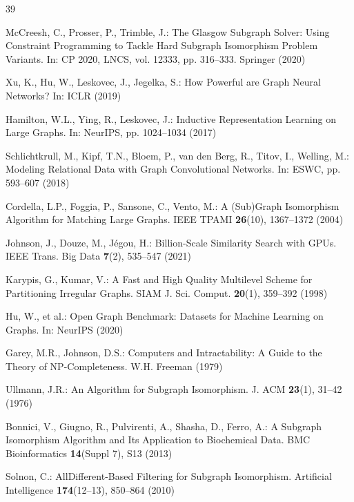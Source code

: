 \documentclass{article}
\begin{document}
{\small
\begin{thebibliography}{39}

McCreesh, C., Prosser, P., Trimble, J.: The Glasgow Subgraph Solver: Using Constraint Programming to Tackle Hard Subgraph Isomorphism Problem Variants. In: CP 2020, LNCS, vol. 12333, pp. 316--333. Springer (2020)

Xu, K., Hu, W., Leskovec, J., Jegelka, S.: How Powerful are Graph Neural Networks? In: ICLR (2019)

Hamilton, W.L., Ying, R., Leskovec, J.: Inductive Representation Learning on Large Graphs. In: NeurIPS, pp. 1024--1034 (2017)

Schlichtkrull, M., Kipf, T.N., Bloem, P., van den Berg, R., Titov, I., Welling, M.: Modeling Relational Data with Graph Convolutional Networks. In: ESWC, pp. 593--607 (2018)

Cordella, L.P., Foggia, P., Sansone, C., Vento, M.: A (Sub)Graph Isomorphism Algorithm for Matching Large Graphs. IEEE TPAMI \textbf{26}(10), 1367--1372 (2004)

Johnson, J., Douze, M., J\'egou, H.: Billion-Scale Similarity Search with GPUs. IEEE Trans. Big Data \textbf{7}(2), 535--547 (2021)

Karypis, G., Kumar, V.: A Fast and High Quality Multilevel Scheme for Partitioning Irregular Graphs. SIAM J. Sci. Comput. \textbf{20}(1), 359--392 (1998)

Hu, W., et al.: Open Graph Benchmark: Datasets for Machine Learning on Graphs. In: NeurIPS (2020)

Garey, M.R., Johnson, D.S.: Computers and Intractability: A Guide to the Theory of NP-Completeness. W.H. Freeman (1979)

Ullmann, J.R.: An Algorithm for Subgraph Isomorphism. J. ACM \textbf{23}(1), 31--42 (1976)

Bonnici, V., Giugno, R., Pulvirenti, A., Shasha, D., Ferro, A.: A Subgraph Isomorphism Algorithm and Its Application to Biochemical Data. BMC Bioinformatics \textbf{14}(Suppl 7), S13 (2013)

Solnon, C.: AllDifferent-Based Filtering for Subgraph Isomorphism. Artificial Intelligence \textbf{174}(12--13), 850--864 (2010)


\end{thebibliography}}
\end{document}
